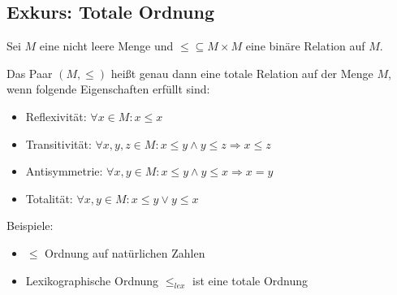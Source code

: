 \documentclass[
    ngerman,
    color=3b,
    load_common, %
    summary,
    boxarc,
]{tuda_summary}
\begin{document}
\subsection{Exkurs: Totale Ordnung}\label{Totale Ordnung}
Sei $M$ eine nicht leere Menge und $\leq \subseteq M\times M $ eine binäre Relation auf $M$.

Das Paar $(M,\leq)$ heißt genau dann eine totale Relation auf der Menge $M$, wenn folgende Eigenschaften erfüllt sind:
\begin{itemize}
    \item Reflexivität: $\forall x \in M: x \leq x$
    \item Transitivität: $\forall x,y,z\in M: x\leq y \land y \leq z \Rightarrow x \leq z$
    \item Antisymmetrie: $\forall x,y\in M: x\leq y \land y \leq x \Rightarrow x = y$
    \item Totalität: $\forall x,y \in M : x\leq y \lor y \leq x$
\end{itemize}
Beispiele:\begin{itemize}
    \item $\leq$ Ordnung auf natürlichen Zahlen
    \item Lexikographische Ordnung $\leq_{lex}$ ist eine totale Ordnung
\end{itemize}
\end{document}
